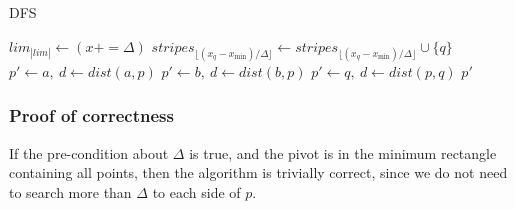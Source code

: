 \begin{algorithm}[h]
    \caption{\Acrlong*{DFS}}
    \label{alg-vstripes}
    \begin{algorithmic}[1]
            \EndFor
             {$lim_{|lim|} \gets (x += \Delta)$}
            \EndWhile
             
             {$stripes_{\lfloor (x_q-x_{\min})/\Delta \rfloor} \gets stripes_{\lfloor (x_q-x_{\min})/\Delta \rfloor} \cup \{q\}$}
            \EndFor
        \EndFunction
             {$p' \gets a,~d \gets dist(a,p)$}
            \EndIf
             {$p' \gets b,~d \gets dist(b,p)$}
            \EndIf
                 {$p' \gets q,~d \gets dist(p,q)$}
                \EndIf
            \EndFor
            \State \Return $p'$
        \EndFunction
    \end{algorithmic}
\end{algorithm}
\subsubsection{Proof of correctness}
If the pre-condition about $\Delta$ is true, and the pivot is in the minimum rectangle containing all points, then the algorithm is trivially correct, since we do not need to search more than $\Delta$ to each side of $p$.
